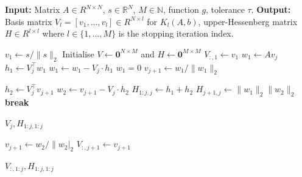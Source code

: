 \documentclass[11pt]{article}
\renewcommand{\mathbb}[1]{\mathds{#1}}
\newcommand{\R}{\mathbb{R}}
\newcommand{\N}{\mathbb{N}}
\theoremstyle{definition}
\theoremstyle{remark}
\theoremstyle{experimental}
\begin{document}
\begin{algorithm}[ht!]
  \caption{Arnoldi with double orthogonalization.}
  \label{alg:arnoldi_double_ortho}
  \begin{algorithmic}[1]
  \State \textbf{Input:} Matrix $ A \in R^{N\times N} $, $ s \in \R^N $, $ M \in \N$, function $
    g $, tolerance $ \tau $.
  \State \textbf{Output: } Basis matrix $ V_l = \left[ v_1,\dots,v_l \right] \in R^{N \times l} $
  for $ K_l(A,b) $, upper-Hessenberg matrix $ H \in R^{l \times l} $ where $ l \in
    \{ 1,\dots,M \}$ is the stopping iteration index.

    \State $ v_1 \leftarrow s / \|s\|_2 $
    \State Initialise $ V \leftarrow \mathbf{0}^{N \times M} $ and $ H \leftarrow
    \mathbf{0}^{M \times M} $
    \State $ V_{:, 1} \leftarrow v_1 $
        \State $ w_1 \leftarrow A v_j $
        \State {}
        \State $ h_1 \leftarrow V_j^\top w_1 $
        \State $ w_1 \leftarrow w_1 - V_j \cdot h_1 $
        \State {} $w_1 = 0$  
        \State $ v_{j+1} \leftarrow w_1 / \|w_1\|_2 $ 
        
        \State {}
        \State $ h_2 \leftarrow V_j^\top v_{j+1} $
        \State $ w_2 \leftarrow v_{j+1} - V_j \cdot h_2 $
        \State $ H_{1:j, j} \leftarrow h_1 + h_2 $
        \State $ H_{j+1, j} \leftarrow \|w_1\|_2 \|w_2\|_2 $\\
        
            \State \textbf{break} 
        \EndIf
        
        \State {}
                \State \Return $ V_j, H_{1:j, 1:j} $
            \EndIf
        \EndIf
        
        \State $ v_{j+1} \leftarrow w_2 / \|w_2|_2 $
        \State $ V_{:, j+1} \leftarrow v_{j+1} $
    \EndFor
    
    \State \Return $ V_{:, 1:j}, H_{1:j, 1:j}$
  \end{algorithmic}
\end{algorithm}
\end{document}
